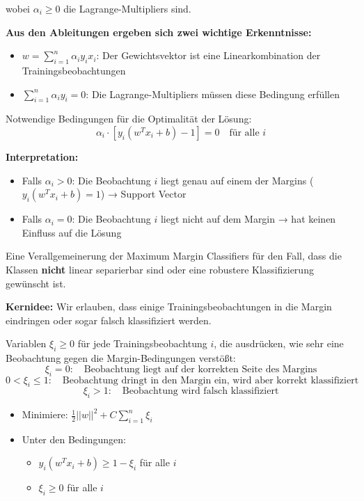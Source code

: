 wobei $\alpha_i \geq 0$ die Lagrange-Multipliers sind.

\textbf{Aus den Ableitungen ergeben sich zwei wichtige Erkenntnisse:}
\begin{itemize}[leftmargin=1.5em]
    \item $w = \sum_{i=1}^{n} \alpha_i y_i x_i$: Der Gewichtsvektor ist eine Linearkombination der Trainingsbeobachtungen
    \item $\sum_{i=1}^{n} \alpha_i y_i = 0$: Die Lagrange-Multipliers müssen diese Bedingung erfüllen
\end{itemize}

Notwendige Bedingungen für die Optimalität der Lösung:
$$\alpha_i \cdot [y_i (w^T x_i + b) - 1] = 0 \quad \text{für alle } i$$

\textbf{Interpretation:}
\begin{itemize}[leftmargin=1.5em]
    \item Falls $\alpha_i > 0$: Die Beobachtung $i$ liegt genau auf einem der Margins ($y_i (w^T x_i + b) = 1$) → Support Vector
    \item Falls $\alpha_i = 0$: Die Beobachtung $i$ liegt nicht auf dem Margin → hat keinen Einfluss auf die Lösung
\end{itemize}

Eine Verallgemeinerung der Maximum Margin Classifiers für den Fall, dass die Klassen \textbf{nicht} linear separierbar sind oder eine robustere Klassifizierung gewünscht ist.

\textbf{Kernidee:} Wir erlauben, dass einige Trainingsbeobachtungen in die Margin eindringen oder sogar falsch klassifiziert werden.

Variablen $\xi_i \geq 0$ für jede Trainingsbeobachtung $i$, die ausdrücken, wie sehr eine Beobachtung gegen die Margin-Bedingungen verstößt:
$$\xi_i = 0: \quad \text{Beobachtung liegt auf der korrekten Seite des Margins}$$
$$0 < \xi_i \leq 1: \quad \text{Beobachtung dringt in den Margin ein, wird aber korrekt klassifiziert}$$
$$\xi_i > 1: \quad \text{Beobachtung wird falsch klassifiziert}$$

\begin{itemize}[leftmargin=1.5em]
    \item Minimiere: $\frac{1}{2}||w||^2 + C \sum_{i=1}^{n} \xi_i$
    \item Unter den Bedingungen: 
    \begin{itemize}[leftmargin=1.5em]
        \item $y_i (w^T x_i + b) \geq 1 - \xi_i$ für alle $i$
        \item $\xi_i \geq 0$ für alle $i$
    \end{itemize}
\end{itemize}

